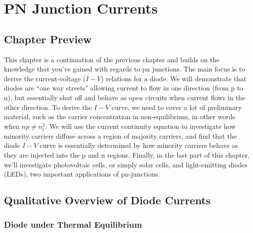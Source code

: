 
\chapter{PN Junction Currents}

\graphicspath{{./figs_pn_currents/}}





\section{Chapter Preview}

This chapter is a continuation of the previous chapter and builds on the knowledge that you've gained with regards to pn junctions.  The main focus is to derive the current-voltage ($I-V$) relations  for a diode.  We will demonstrate that diodes are ``one way streets" allowing current to flow in one direction (from p to n), but essentially shut off and behave as open circuits when current flows in the other direction.  To derive the $I-V$ curve, we need to cover a lot of preliminary material, such as the carrier concentration in non-equilibrium, in other words when $n p \neq n_i^2$.  We will use the current continuity equation to investigate how minority carriers diffuse across a region of majority carriers, and find that the diode $I-V$ curve is essentially determined by how minority carriers behave as they are injected into the p and n regions.  Finally, in the last part of this chapter, we'll investigate photovoltaic cells, or simply solar cells, and light-emitting diodes (LEDs), two important applications of pn-junctions.

 



\section{Qualitative Overview of Diode Currents}

\subsection{Diode under Thermal Equilibrium}

